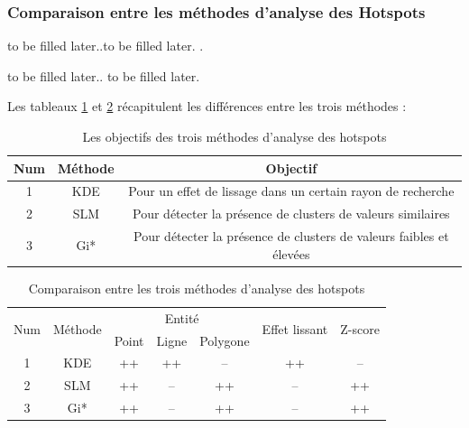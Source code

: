 \medskip

\subsubsection{Comparaison entre les méthodes d'analyse des Hotspots}to be filled later.\parencite{kalinic_kernel_2018}.to be filled later. \parencite{kalinic_kernel_2018}.

\medskip
to be filled later.\parencite{chang_introduction_2019}. to be filled later.

\medskip

Les tableaux \ref{tab:hotspot-analysis-comparison-1} et \ref{tab:hotspot-analysis-comparison-2} récapitulent les différences entre les trois méthodes :

\medskip

\begin{table}[h!]
    \centering
    \begin{tabular}{|c|c|c|}
        \hline
        Num & Méthode & Objectif \\
        \hline
         1 & KDE &  Pour un effet de lissage dans un certain rayon de recherche \\
        \hline
         2 & SLM & Pour détecter la présence de clusters de valeurs similaires \\
        \hline
        3 & Gi* &  Pour détecter la présence de clusters de valeurs faibles et élevées\\
        \hline
    \end{tabular}
    \caption{Les objectifs des trois méthodes d'analyse des hotspots}
    \label{tab:hotspot-analysis-comparison-1}
\end{table}
\FloatBarrier

\medskip

\begin{table}[h!]
    \centering
    \begin{tabular}{|c|c|c|c|c|c|c|}
        \hline
        \multirow{2}{*}{Num} & \multirow{2}{*}{Méthode} & \multicolumn{3}{c|}{Entité} &\multirow{2}{*}{Effet lissant} & \multirow{2}{*}{Z-score} \\
        \cline{3-5}
           & & Point & Ligne & Polygone & &  \\
        \hline
         1 & KDE & ++ & ++ & -- & ++ & --  \\
        \hline
         2 & SLM & ++ & -- & ++ & -- & ++  \\
        \hline
        3 & Gi* & ++ & --  & ++ & -- & ++ \\
        \hline
    \end{tabular}
    \caption{Comparaison entre les trois méthodes d'analyse des hotspots}
    \label{tab:hotspot-analysis-comparison-2}
\end{table}
\FloatBarrier




